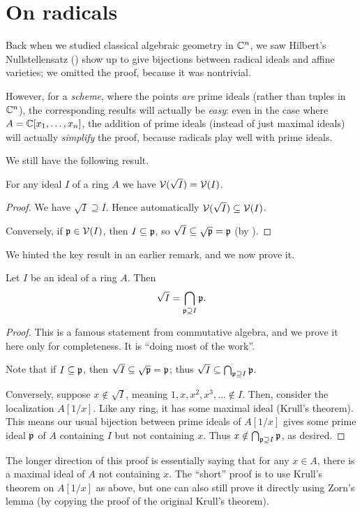 \section{On radicals}
Back when we studied classical algebraic geometry in $\mathbb C^n$,
we saw Hilbert's Nullstellensatz () show up
to give bijections between radical ideals and affine varieties;
we omitted the proof, because it was nontrivial.

However, for a \emph{scheme}, where the points \emph{are} prime ideals
(rather than tuples in $\mathbb C^n$),
the corresponding results will actually be \emph{easy}:
even in the case where $A = \mathbb C[x_1, \dots, x_n]$,
the addition of prime ideals (instead of just maximal ideals)
will actually \emph{simplify} the proof,
because radicals play well with prime ideals.

We still have the following result.
\begin{proposition}
	[$\VV(\sqrt I) = \VV(I)$]
	For any ideal $I$ of a ring $A$
	we have $\VV(\sqrt I) = \VV(I)$.
\end{proposition}
\begin{proof}
	We have $\sqrt I \supseteq I$.
	Hence automatically $\mathcal V(\sqrt I) \subseteq \mathcal V(I)$.

	Conversely, if $\mathfrak p \in \mathcal V(I)$, then $I \subseteq \mathfrak p$,
	so $\sqrt I \subseteq \sqrt{\mathfrak p} = \mathfrak p$
	(by ).
\end{proof}

We hinted the key result in an earlier remark,
and we now prove it.
\begin{theorem}
	\label{thm:radical_intersect_prime}
	Let $I$ be an ideal of a ring $A$.
	Then \[ \sqrt I = \bigcap_{\mathfrak p \supseteq I} \mathfrak p. \]
\end{theorem}
\begin{proof}
	This is a famous statement from commutative algebra,
	and we prove it here only for completeness.
	It is ``doing most of the work''.

	Note that if $I \subseteq \mathfrak p$,
	then $\sqrt I \subseteq \sqrt{\mathfrak p} = \mathfrak p$;
	thus $\sqrt I \subseteq \bigcap_{\mathfrak p \supseteq I} \mathfrak p$.

	Conversely, suppose $x \notin \sqrt I$,
	meaning $1, x, x^2, x^3, \dots \notin I$.
	Then, consider the localization $A[1/x]$.
	Like any ring, it has some maximal ideal (Krull's theorem).
	This means our usual bijection between prime ideals of $A[1/x]$
	gives some prime ideal $\mathfrak p$ of $A$ containing $I$ but not containing $x$.
	Thus $x \notin \bigcap_{\mathfrak p \supseteq I} \mathfrak p$,
	as desired.
\end{proof}
\begin{remark}
	The longer direction of this proof is essentially
	saying that for any $x \in A$,
	there is a maximal ideal of $A$ not containing $x$.
	The ``short'' proof is to use Krull's theorem on $A[1/x]$ as above,
	but one can also still prove it directly using Zorn's lemma
	(by copying the proof of the original Krull's theorem).
\end{remark}

